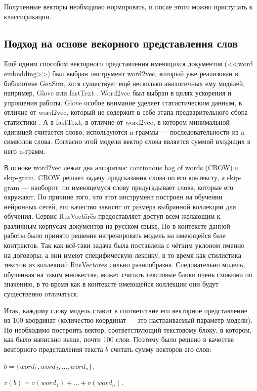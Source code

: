 \documentclass[14pt]{matmex-diploma-custom}
\begin{document}
Полученные векторы необходимо нормировать, и после этого можно приступать к классификации.

\subsection{Подход на основе векорного представления слов}

Ещё одним способом векторного представления имеющихся документов (<<word embedding>>) был выбран инструмент word2vec, который уже реализован в библиотеке GenSim, хотя существует ещё несколько аналогичных ему моделей, например, Glove \cite{glove} или fastText \cite{fasttext}. Word2vec был выбран в целях ускорения и упрощения работы. Glove особое внимание уделяет статистическим данным, в отличие от word2vec, который не содержит в себе этапа предварительного сбора статистики \cite{zakirov, predict}. А в fastText, в отличие от word2vec, в котором минимальной единицей считается слово, используются n-граммы — последовательности из n символов слова. Согласно этой модели вектор слова является суммой входящих в него n-грамм.

В основе word2vec лежат два алгоритма: continuous bag of words (CBOW) и skip-gram. CBOW решает задачу предсказания слова по \linebreak его контексту, а skip-gram --- наоборот, по имеющемуся слову предугадывает слова, которые его окружают. По причине того, что этот \linebreak инструмент построен на обучении нейронных сетей, его качество \linebreak зависит от размера выбранной коллекции для обучения. Сервис \linebreak RusVectōrēs предоставляет доступ всем желающим к различным корпусам документов на русском языке. Но в контексте данной работы было принято решение натренировать модель на имеющейся базе контрактов. Так как всё-таки задача была поставлена с чётким уклоном именно на договоры, а они имеют специфическую лексику, в то время как стилистика текстов из коллекций RusVectōrēs сильно разнообразна. Следовательно модель, обученная на таком множестве, может считать текстовые блоки очень схожими по значению, в то время как в контексте имеющейся коллекции они будут существенно отличаться.  

Итак, каждому слову модель ставит в соответствие его векторное представление из 100 координат (количество координат --- это настраиваемый параметр модели). Но необходимо построить вектор, соответствующий текстовому блоку, в котором, как было написано выше, почти 100 слов. Поэтому было решено в качестве векторного представления текста $b$ считать сумму векторов его слов:
\begin{center}
	$b = \{word_1, word_2, …, word_n\}$,
	
	$v(b) = v(word_1) +\ldots + v(word_n)$.
\end{center}
\end{document}
